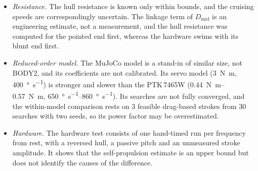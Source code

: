 \begin{itemize}
  \item \emph{Resistance.} The hull resistance is known only within bounds, and the cruising speeds are correspondingly
        uncertain. The linkage term of $D_\text{mid}$ is an engineering estimate, not a measurement, and the hull resistance was computed
        for the pointed end first, whereas the hardware swims with its blunt end first.
  \item \emph{Reduced-order model.} The MuJoCo model is a stand-in of similar size, not BODY2, and its coefficients are not
        calibrated. Its servo model (\SI{3}{\newton\metre}, \SI{400}{\degree\per\second}) is stronger and slower than the PTK\,7465W
        (\SIrange{0.44}{0.57}{\newton\metre}, \SIrange{650}{860}{\degree\per\second}). Its searches are not fully converged, and the
        within-model comparison rests on 3 feasible drag-based strokes from 30 searches with two seeds, so its power factor may
        be overestimated.
  \item \emph{Hardware.} The hardware test consists of one hand-timed run per frequency from rest, with a reversed hull, a passive
        pitch and an unmeasured stroke amplitude. It shows that the self-propulsion estimate is an upper bound but does not identify
        the causes of the difference.
\end{itemize}
